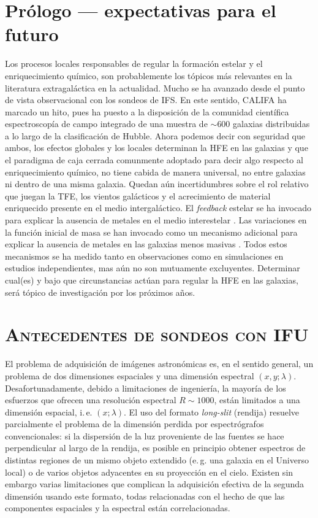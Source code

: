\documentclass{article}
\begin{document}
\section{Prólogo --- expectativas para el futuro}
%
Los procesos locales responsables de regular la formación estelar y el enriquecimiento químico, son
probablemente los tópicos más relevantes en la literatura extragaláctica en la actualidad. Mucho se
ha avanzado desde el punto de vista observacional con los sondeos de IFS. En este sentido, CALIFA ha
marcado un hito, pues ha puesto a la disposición de la comunidad científica espectroscopía de campo
integrado de una muestra de $\sim600$ galaxias distribuidas a lo largo de la clasificación de
Hubble. Ahora podemos decir con seguridad que ambos, los efectos globales y los locales determinan
la HFE en las galaxias y que el paradigma de caja cerrada comunmente adoptado para decir algo
respecto al enriquecimiento químico, no tiene cabida de manera universal, no entre galaxias ni
dentro de una misma galaxia. Quedan aún incertidumbres sobre el rol relativo que juegan la TFE, los
vientos galácticos y el acrecimiento de material enriquecido presente en el medio intergaláctico. El
\emph{feedback} estelar se ha invocado para explicar la ausencia de metales en el medio interestelar
\citep{Tremonti2004, Kobayashi2007}. Las variaciones en la función inicial de masa se han invocado
como un mecanismo adicional para explicar la ausencia de metales en las galaxias menos masivas
\citep{Koppen2007}. Todos estos mecanismos se ha medido tanto en observaciones como en simulaciones
en estudios independientes, mas aún no son mutuamente excluyentes. Determinar cual(es) y bajo que
circunstancias actúan para regular la HFE en las galaxias, será tópico de investigación por los
próximos años.
%



\section{\textsc{Antecedentes de sondeos con IFU}}
%
El problema de adquisición de imágenes astronómicas es, en el sentido general, un problema de dos
dimensiones espaciales y una dimensión espectral $(x,y;\lambda)$. Desafortunadamente, debido a
limitaciones de ingeniería, la mayoría de los esfuerzos que ofrecen una resolución espectral
$R\sim1000$, están limitados a una dimensión espacial, i.\,e. $(x;\lambda)$. El uso del formato
\emph{long-slit} (rendija) resuelve parcialmente el problema de la dimensión perdida por
espectrógrafos convencionales: si la dispersión de la luz proveniente de las fuentes se hace
perpendicular al largo de la rendija, es posible en principio obtener espectros de distintas
regiones de un mismo objeto extendido (e.\,g. una galaxia en el Universo local) o de varios objetos
adyacentes en su proyección en el cielo. Existen sin embargo varias limitaciones que complican la
adquisición efectiva de la segunda dimensión usando este formato, todas relacionadas con el hecho de
que las componentes espaciales y la espectral están correlacionadas.
\end{document}
